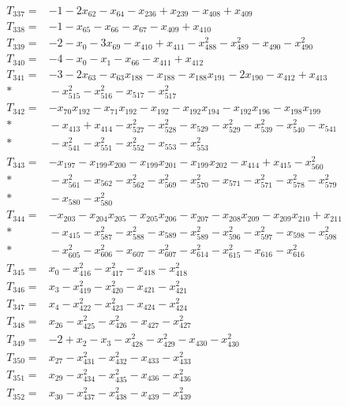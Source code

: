 \begin{align*}
T_{337}={}&-1-2x_{62}-x_{64}-x_{236}+x_{239}-x_{408}+x_{409}\\[3pt]
T_{338}={}&-1-x_{65}-x_{66}-x_{67}-x_{409}+x_{410}\\[3pt]
T_{339}={}&-2-x_{0}-3x_{69}-x_{410}+x_{411}-x_{488}^{2}-x_{489}^{2}-x_{490}-x_{490}^{2}\\[3pt]
T_{340}={}&-4-x_{0}-x_{1}-x_{66}-x_{411}+x_{412}\\[3pt]
T_{341}={}&-3-2x_{63}-x_{63}x_{188}-x_{188}-x_{188}x_{191}-2x_{190}-x_{412}+x_{413}\\*
&{}-x_{515}^{2}-x_{516}^{2}-x_{517}-x_{517}^{2}\\[3pt]
T_{342}={}&-x_{70}x_{192}-x_{71}x_{192}-x_{192}-x_{192}x_{194}-x_{192}x_{196}-x_{198}x_{199}\\*
&{}-x_{413}+x_{414}-x_{527}^{2}-x_{528}^{2}-x_{529}-x_{529}^{2}-x_{539}^{2}-x_{540}^{2}-x_{541}\\*
&{}-x_{541}^{2}-x_{551}^{2}-x_{552}^{2}-x_{553}-x_{553}^{2}\\[3pt]
T_{343}={}&-x_{197}-x_{199}x_{200}-x_{199}x_{201}-x_{199}x_{202}-x_{414}+x_{415}-x_{560}^{2}\\*
&{}-x_{561}^{2}-x_{562}-x_{562}^{2}-x_{569}^{2}-x_{570}^{2}-x_{571}-x_{571}^{2}-x_{578}^{2}-x_{579}^{2}\\*
&{}-x_{580}-x_{580}^{2}\\[3pt]
T_{344}={}&-x_{203}-x_{204}x_{205}-x_{205}x_{206}-x_{207}-x_{208}x_{209}-x_{209}x_{210}+x_{211}\\*
&{}-x_{415}-x_{587}^{2}-x_{588}^{2}-x_{589}-x_{589}^{2}-x_{596}^{2}-x_{597}^{2}-x_{598}-x_{598}^{2}\\*
&{}-x_{605}^{2}-x_{606}^{2}-x_{607}-x_{607}^{2}-x_{614}^{2}-x_{615}^{2}-x_{616}-x_{616}^{2}\\[3pt]
T_{345}={}&x_{0}-x_{416}^{2}-x_{417}^{2}-x_{418}-x_{418}^{2}\\[3pt]
T_{346}={}&x_{3}-x_{419}^{2}-x_{420}^{2}-x_{421}-x_{421}^{2}\\[3pt]
T_{347}={}&x_{4}-x_{422}^{2}-x_{423}^{2}-x_{424}-x_{424}^{2}\\[3pt]
T_{348}={}&x_{26}-x_{425}^{2}-x_{426}^{2}-x_{427}-x_{427}^{2}\\[3pt]
T_{349}={}&-2+x_{2}-x_{3}-x_{428}^{2}-x_{429}^{2}-x_{430}-x_{430}^{2}\\[3pt]
T_{350}={}&x_{27}-x_{431}^{2}-x_{432}^{2}-x_{433}-x_{433}^{2}\\[3pt]
T_{351}={}&x_{29}-x_{434}^{2}-x_{435}^{2}-x_{436}-x_{436}^{2}\\[3pt]
T_{352}={}&x_{30}-x_{437}^{2}-x_{438}^{2}-x_{439}-x_{439}^{2}\\[3pt]

\end{align*}
